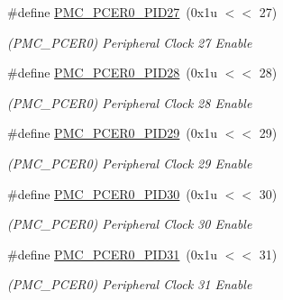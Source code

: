 \begin{DoxyCompactItemize}
\mbox{\label{group__SAME70__PMC_ga8e4d278157b4876dfae3a3219188c267}} 
\#define \mbox{\hyperlink{group__SAME70__PMC_ga8e4d278157b4876dfae3a3219188c267}{P\+M\+C\+\_\+\+P\+C\+E\+R0\+\_\+\+P\+I\+D27}}~(0x1u $<$$<$ 27)
\begin{DoxyCompactList}\small\item\em (P\+M\+C\+\_\+\+P\+C\+E\+R0) Peripheral Clock 27 Enable \end{DoxyCompactList}\item 
\mbox{\label{group__SAME70__PMC_ga3941f6eb675de75097b0324b62f6f23f}} 
\#define \mbox{\hyperlink{group__SAME70__PMC_ga3941f6eb675de75097b0324b62f6f23f}{P\+M\+C\+\_\+\+P\+C\+E\+R0\+\_\+\+P\+I\+D28}}~(0x1u $<$$<$ 28)
\begin{DoxyCompactList}\small\item\em (P\+M\+C\+\_\+\+P\+C\+E\+R0) Peripheral Clock 28 Enable \end{DoxyCompactList}\item 
\mbox{\label{group__SAME70__PMC_ga9427ce030d0f8e9f86f64bf9678422e3}} 
\#define \mbox{\hyperlink{group__SAME70__PMC_ga9427ce030d0f8e9f86f64bf9678422e3}{P\+M\+C\+\_\+\+P\+C\+E\+R0\+\_\+\+P\+I\+D29}}~(0x1u $<$$<$ 29)
\begin{DoxyCompactList}\small\item\em (P\+M\+C\+\_\+\+P\+C\+E\+R0) Peripheral Clock 29 Enable \end{DoxyCompactList}\item 
\mbox{\label{group__SAME70__PMC_ga6cf8e6dd627939d699ac9d52591d07b1}} 
\#define \mbox{\hyperlink{group__SAME70__PMC_ga6cf8e6dd627939d699ac9d52591d07b1}{P\+M\+C\+\_\+\+P\+C\+E\+R0\+\_\+\+P\+I\+D30}}~(0x1u $<$$<$ 30)
\begin{DoxyCompactList}\small\item\em (P\+M\+C\+\_\+\+P\+C\+E\+R0) Peripheral Clock 30 Enable \end{DoxyCompactList}\item 
\mbox{\label{group__SAME70__PMC_ga6610934096cd9e4f8a23008eaf04cd14}} 
\#define \mbox{\hyperlink{group__SAME70__PMC_ga6610934096cd9e4f8a23008eaf04cd14}{P\+M\+C\+\_\+\+P\+C\+E\+R0\+\_\+\+P\+I\+D31}}~(0x1u $<$$<$ 31)
\begin{DoxyCompactList}\small\item\em (P\+M\+C\+\_\+\+P\+C\+E\+R0) Peripheral Clock 31 Enable \end{DoxyCompactList}\item 
$$
\end{DoxyCompactItemize}
